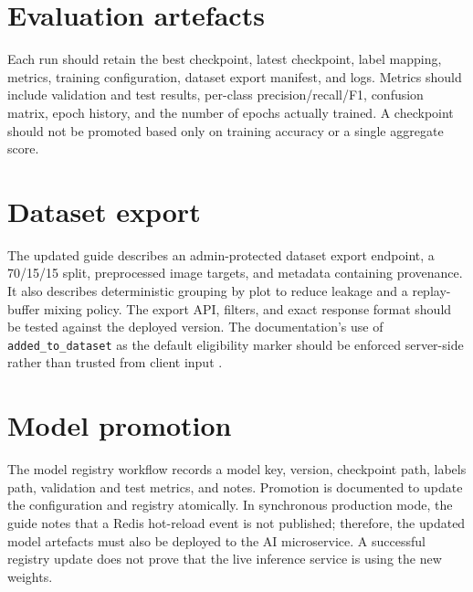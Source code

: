 \documentclass[12pt,a4paper,oneside,openany]{report}
\begin{document}
\section{Evaluation artefacts}
Each run should retain the best checkpoint, latest checkpoint, label mapping, metrics, training configuration, dataset export manifest, and logs. Metrics should include validation and test results, per-class precision/recall/F1, confusion matrix, epoch history, and the number of epochs actually trained. A checkpoint should not be promoted based only on training accuracy or a single aggregate score.

\section{Dataset export}
The updated guide describes an admin-protected dataset export endpoint, a 70/15/15 split, preprocessed image targets, and metadata containing provenance. It also describes deterministic grouping by plot to reduce leakage and a replay-buffer mixing policy. The export API, filters, and exact response format should be tested against the deployed version. The documentation's use of \texttt{added\_to\_dataset} as the default eligibility marker should be enforced server-side rather than trusted from client input \cite{mlops_guide}.

\section{Model promotion}
The model registry workflow records a model key, version, checkpoint path, labels path, validation and test metrics, and notes. Promotion is documented to update the configuration and registry atomically. In synchronous production mode, the guide notes that a Redis hot-reload event is not published; therefore, the updated model artefacts must also be deployed to the AI microservice. A successful registry update does not prove that the live inference service is using the new weights.
\end{document}
